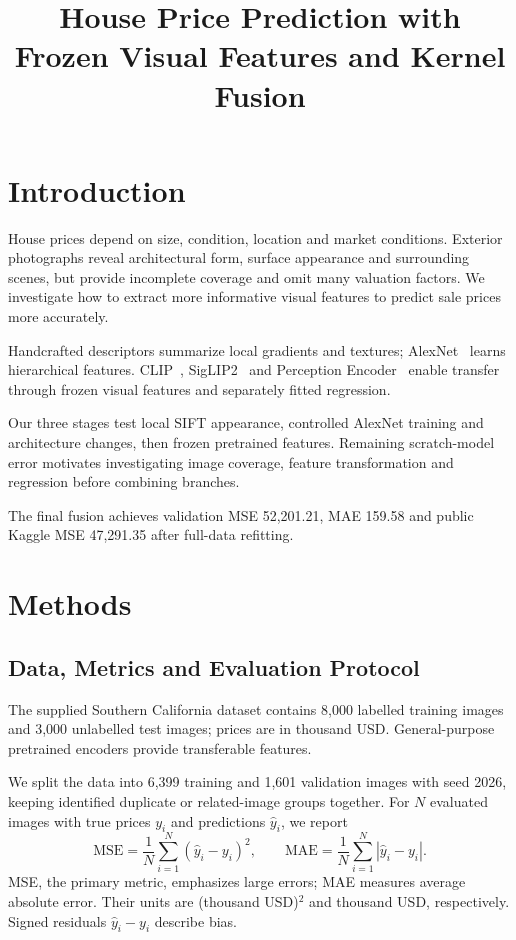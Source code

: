 \documentclass[conference,a4paper]{IEEEtran}
\title{House Price Prediction with Frozen Visual Features and Kernel Fusion}
\author{\IEEEauthorblockN{Shifeng Chen \qquad Haoxuan Ying}
\IEEEauthorblockA{1686631 \qquad 1255329\\
COMP90086 Computer Vision, The University of Melbourne}}
\begin{document}
\maketitle
\raggedbottom

\section{Introduction}
House prices depend on size, condition, location and market conditions. Exterior photographs reveal architectural form, surface appearance and surrounding scenes, but provide incomplete coverage and omit many valuation factors. We investigate how to extract more informative visual features to predict sale prices more accurately.

Handcrafted descriptors summarize local gradients and textures; AlexNet~\cite{alexnet} learns hierarchical features. CLIP~\cite{clip}, SigLIP2~\cite{siglip2} and Perception Encoder~\cite{pe} enable transfer through frozen visual features and separately fitted regression.

Our three stages test local SIFT appearance, controlled AlexNet training and architecture changes, then frozen pretrained features. Remaining scratch-model error motivates investigating image coverage, feature transformation and regression before combining branches.

The final fusion achieves validation MSE 52,201.21, MAE 159.58 and public Kaggle MSE 47,291.35 after full-data refitting.

\section{Methods}
\subsection{Data, Metrics and Evaluation Protocol}
The supplied Southern California dataset contains 8,000 labelled training images and 3,000 unlabelled test images; prices are in thousand USD. General-purpose pretrained encoders provide transferable features.

We split the data into 6,399 training and 1,601 validation images with seed 2026, keeping identified duplicate or related-image groups together. For $N$ evaluated images with true prices $y_i$ and predictions $\hat y_i$, we report
\begin{equation}
\mathrm{MSE}=\frac{1}{N}\sum_{i=1}^{N}(\hat y_i-y_i)^2,\qquad
\mathrm{MAE}=\frac{1}{N}\sum_{i=1}^{N}|\hat y_i-y_i|.
\end{equation}
MSE, the primary metric, emphasizes large errors; MAE measures average absolute error. Their units are (thousand USD)$^2$ and thousand USD, respectively. Signed residuals $\hat y_i-y_i$ describe bias.
\end{document}
